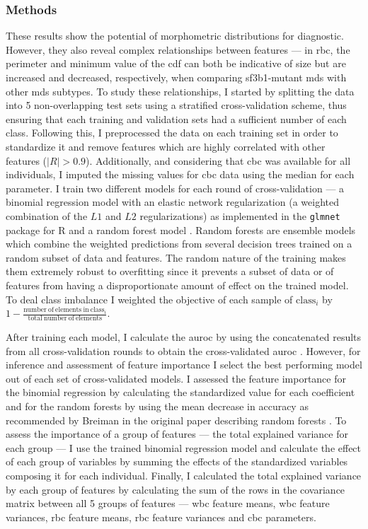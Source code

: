 \subsubsection{Methods}

These results show the potential of morphometric distributions for diagnostic. However, they also reveal complex relationships between features --- in \ac{rbc}, the perimeter and minimum value of the \ac{cdf} can both be indicative of size but are increased and decreased, respectively, when comparing \ac{sf3b1}-mutant \ac{mds} with other \ac{mds} subtypes. To study these relationships, I started by splitting the data into 5 non-overlapping test sets using a stratified cross-validation scheme, thus ensuring that each training and validation sets had a sufficient number of each class. Following this, I preprocessed the data on each training set in order to standardize it and remove features which are highly correlated with other features ($|R|>0.9$). Additionally, and considering that \ac{cbc} was available for all individuals, I imputed the missing values for \ac{cbc} data using the median for each parameter. I train two different models for each round of cross-validation --- a binomial regression model with an elastic network regularization (a weighted combination of the $L1$ and $L2$ regularizations) as implemented in the \texttt{glmnet} package for R \cite{Friedman2010-gl} and a random forest model \cite{Breiman2001-yz}. Random forests are ensemble models which combine the weighted predictions from several decision trees trained on a random subset of data and features. The random nature of the training makes them extremely robust to overfitting since it prevents a subset of data or of features from having a disproportionate amount of effect on the trained model. To deal class imbalance I weighted the objective of each sample of $\mathrm{class}_i$ by $1-\frac{\mathrm{number\ of\ elements\ in\ class}_i}{\mathrm{total\ number\ of\ elements}}$. 

After training each model, I calculate the \ac{auroc} by using the concatenated results from all cross-validation rounds to obtain the cross-validated \ac{auroc} \cite{Fawcett2006-mo}. However, for inference and assessment of feature importance I select the best performing model out of each set of cross-validated models. I assessed the feature importance for the binomial regression by calculating the standardized value for each coefficient and for the random forests by using the mean decrease in accuracy as recommended by Breiman in the original paper describing random forests \cite{Breiman2001-yz}. To assess the importance of a group of features --- the total explained variance for each group --- I use the trained binomial regression model and calculate the effect of each group of variables by summing the effects of the standardized variables composing it for each individual. Finally, I calculated the total explained variance by each group of features by calculating the sum of the rows in the covariance matrix between all 5 groups of features --- \ac{wbc} feature means, \ac{wbc} feature variances, \ac{rbc} feature means, \ac{rbc} feature variances and \ac{cbc} parameters.

